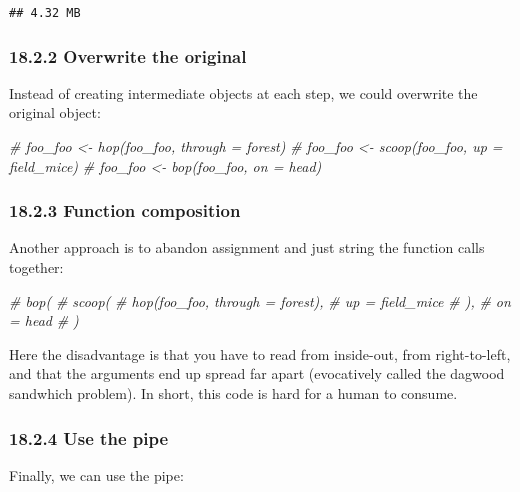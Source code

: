 \documentclass[
]{article}
\newenvironment{Shaded}{\begin{snugshade}}{\end{snugshade}}
\newcommand{\CommentTok}[1]{\textcolor[rgb]{0.56,0.35,0.01}{\textit{#1}}}
\begin{document}
\begin{verbatim}
## 4.32 MB
\end{verbatim}

\hypertarget{overwrite-the-original}{%
\subsubsection{18.2.2 Overwrite the
original}\label{overwrite-the-original}}

Instead of creating intermediate objects at each step, we could
overwrite the original object:

\begin{Shaded}
\begin{Highlighting}[]
\CommentTok{\# foo\_foo \textless{}{-} hop(foo\_foo, through = forest)}
\CommentTok{\# foo\_foo \textless{}{-} scoop(foo\_foo, up = field\_mice)}
\CommentTok{\# foo\_foo \textless{}{-} bop(foo\_foo, on = head)}
\end{Highlighting}
\end{Shaded}

\hypertarget{function-composition}{%
\subsubsection{18.2.3 Function composition}\label{function-composition}}

Another approach is to abandon assignment and just string the function
calls together:

\begin{Shaded}
\begin{Highlighting}[]
\CommentTok{\# bop(}
\CommentTok{\#   scoop(}
\CommentTok{\#     hop(foo\_foo, through = forest),}
\CommentTok{\#     up = field\_mice}
\CommentTok{\#   ), }
\CommentTok{\#   on = head}
\CommentTok{\# )}
\end{Highlighting}
\end{Shaded}

Here the disadvantage is that you have to read from inside-out, from
right-to-left, and that the arguments end up spread far apart
(evocatively called the dagwood sandwhich problem). In short, this code
is hard for a human to consume.

\hypertarget{use-the-pipe}{%
\subsubsection{18.2.4 Use the pipe}\label{use-the-pipe}}

Finally, we can use the pipe:
\end{document}
